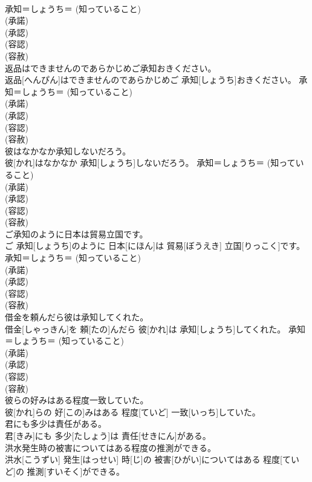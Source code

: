 \documentclass[8pt]{extreport}
\begin{document}
\begin{CJK}{UTF8}{min}
{\\	承知＝しょうち＝ (知っていること) 
\\	(承諾) 
\\	(承認) 
\\	(容認) 
\\	(容赦)
\\	返品はできませんのであらかじめご承知おきください。	
\\	返品[へんぴん]はできませんのであらかじめご 承知[しょうち]おきください。	承知＝しょうち＝ (知っていること) 
\\	(承諾) 
\\	(承認) 
\\	(容認) 
\\	(容赦)
\\	彼はなかなか承知しないだろう。	
\\	彼[かれ]はなかなか 承知[しょうち]しないだろう。	承知＝しょうち＝ (知っていること) 
\\	(承諾) 
\\	(承認) 
\\	(容認) 
\\	(容赦)
\\	ご承知のように日本は貿易立国です。	
\\	ご 承知[しょうち]のように 日本[にほん]は 貿易[ぼうえき] 立国[りっこく]です。	承知＝しょうち＝ (知っていること) 
\\	(承諾) 
\\	(承認) 
\\	(容認) 
\\	(容赦)
\\	借金を頼んだら彼は承知してくれた。	
\\	借金[しゃっきん]を 頼[たの]んだら 彼[かれ]は 承知[しょうち]してくれた。	承知＝しょうち＝ (知っていること) 
\\	(承諾) 
\\	(承認) 
\\	(容認) 
\\	(容赦)
\\	彼らの好みはある程度一致していた。	
\\	彼[かれ]らの 好[この]みはある 程度[ていど] 一致[いっち]していた。	
\\	君にも多少は責任がある。	
\\	君[きみ]にも 多少[たしょう]は 責任[せきにん]がある。	
\\	洪水発生時の被害についてはある程度の推測ができる。	
\\	洪水[こうずい] 発生[はっせい] 時[じ]の 被害[ひがい]についてはある 程度[ていど]の 推測[すいそく]ができる。	
}
\end{CJK}
\end{document}
